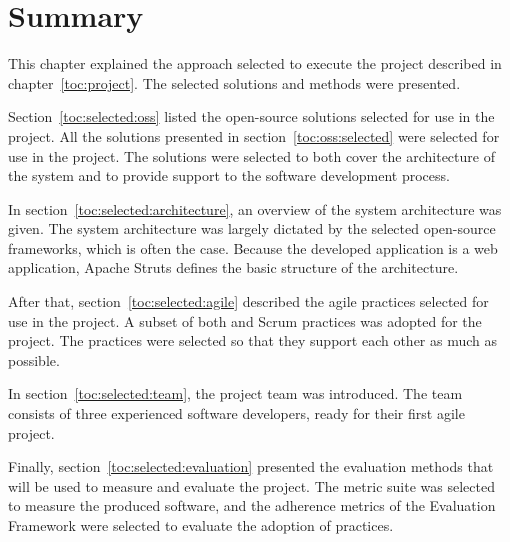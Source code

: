 \section{Summary}
\label{toc:selected:summary}

This chapter explained the approach selected to execute the project
described in chapter~\ref{toc:project}. The selected solutions and
methods were presented.

Section~\ref{toc:selected:oss} listed the open-source solutions 
selected for use in the project. All the solutions presented in 
section~\ref{toc:oss:selected} were selected for use in the project. 
The solutions were selected to both cover the architecture of the 
system and to provide support to the software development process.

In section~\ref{toc:selected:architecture}, an overview of the system 
architecture was given. The system architecture was largely dictated 
by the selected open-source frameworks, which is often the case. 
Because the developed application is a web application, Apache Struts 
defines the basic structure of the architecture.

After that, section~\ref{toc:selected:agile} described the agile 
practices selected for use in the project. A subset of both 
 and Scrum practices was adopted for the project. The 
practices were selected so that they support each other as much as 
possible.

In section~\ref{toc:selected:team}, the project team was introduced. 
The team consists of three experienced software developers, ready for 
their first agile project.

Finally, section~\ref{toc:selected:evaluation} presented the 
evaluation methods that will be used to measure and evaluate the 
project. The  metric suite was selected to measure the 
produced software, and the  adherence metrics of the 
 Evaluation Framework were selected to evaluate the 
adoption of  practices.
